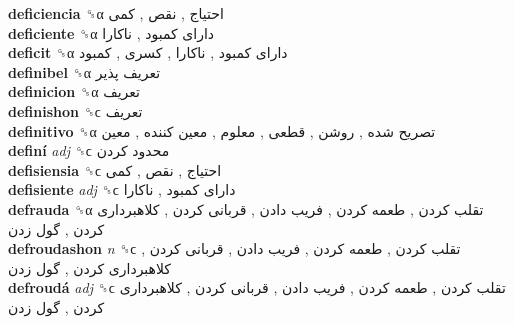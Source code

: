 \textbf{deficiencia} ␝α   احتیاج ,  نقص ,  کمی   \\
\textbf{deficiente} ␝α   دارای کمبود ,  ناکارا   \\
\textbf{deficit} ␝α   دارای کمبود ,  ناکارا ,  کسری ,  کمبود   \\
\textbf{definibel} ␝α   تعریف پذیر   \\
\textbf{definicion} ␝α   تعریف   \\
\textbf{definishon} ␝ϲ   تعریف   \\
\textbf{definitivo} ␝α   تصریح شده ,  روشن ,  قطعی ,  معلوم ,  معین کننده ,  معین   \\
\textbf{definí} \emph{adj}  ␝ϲ   محدود کردن   \\
\textbf{defisiensia} ␝ϲ   احتیاج ,  نقص ,  کمی   \\
\textbf{defisiente} \emph{adj}  ␝ϲ   دارای کمبود ,  ناکارا   \\
\textbf{defrauda} ␝α   تقلب کردن ,  طعمه کردن ,  فریب دادن ,  قربانی کردن ,  کلاهبرداری کردن ,  گول زدن   \\
\textbf{defroudashon} \emph{n}  ␝ϲ   تقلب کردن ,  طعمه کردن ,  فریب دادن ,  قربانی کردن ,  کلاهبرداری کردن ,  گول زدن   \\
\textbf{defroudá} \emph{adj}  ␝ϲ   تقلب کردن ,  طعمه کردن ,  فریب دادن ,  قربانی کردن ,  کلاهبرداری کردن ,  گول زدن   \\

